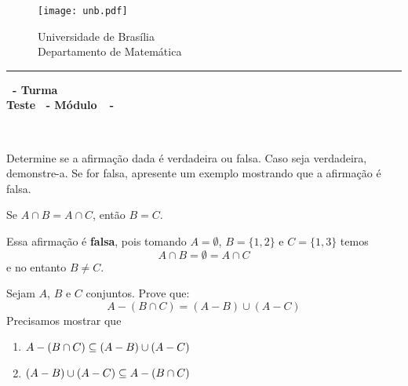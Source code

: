 \documentclass[12pt]{exam}
\begin{document}
    \begin{figure}[h]
        \begin{minipage}[c]{1.7cm}
            \texttt{[image: unb.pdf]}
        \end{minipage}
        \hspace{0pt}
        \begin{minipage}[c]{4in}
            {Universidade de Brasília} \\
            {Departamento de Matemática}
        \end{minipage}
    \end{figure}
    \hrule
    \begin{center}
        {\Large\bf \disciplina\ - Turma \turma}  \\
         {\large\bf Teste \numeroteste\ - Módulo\ \modulo\ -\ \dataavaliacao}
    \end{center}

    \\
    \vspace*{.01cm}

    \vspace{.4cm}

    \questao{} Determine se a afirmação dada é verdadeira ou falsa. Caso seja verdadeira, demonstre-a. Se for falsa, apresente um exemplo mostrando que a afirmação é falsa.
    \begin{center}
        Se $A \cap B = A \cap C$, então $B = C$.
    \end{center}
    \solucao Essa afirmação é \textbf{falsa}, pois tomando $A = \emptyset$, $B = \{1, 2\}$ e $C = \{1, 3\}$ temos
    \[
        A \cap B = \emptyset = A \cap C
    \]
    e no entanto $B \ne C$.

    \vspace*{.75cm}

    \questao{} Sejam $A$, $B$ e $C$ conjuntos. Prove que:
    \[
        A - (B \cap C) = (A - B) \cup (A - C)
    \]
    \solucao Precisamos mostrar que
    \begin{enumerate}[label={\roman*})]
        \item $A - (B \cap C) \subseteq (A - B) \cup (A - C)$
        \item $(A - B) \cup (A - C) \subseteq A - (B \cap C)$
    \end{enumerate}
\end{document}
